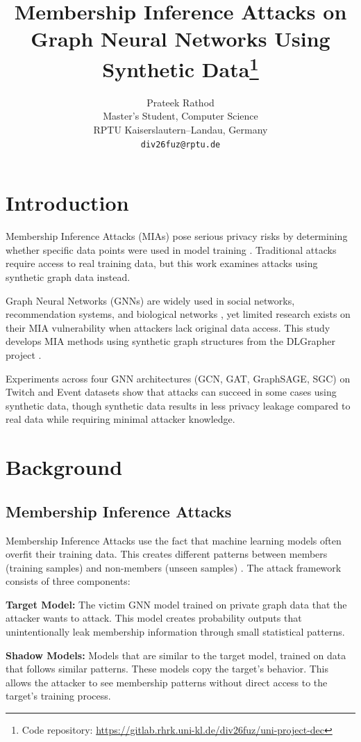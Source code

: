 \documentclass{article}
\title{Membership Inference Attacks on Graph Neural Networks Using Synthetic Data\footnote{Code repository: \url{https://gitlab.rhrk.uni-kl.de/div26fuz/uni-project-dec}}}
\author{Prateek Rathod \\
Master’s Student, Computer Science \\
RPTU Kaiserslautern–Landau, Germany \\
\texttt{div26fuz@rptu.de}}
\date{}
\begin{document}
\maketitle

\section{Introduction}
Membership Inference Attacks (MIAs) pose serious privacy risks by determining whether specific data points were used in model training \cite{shokri2017membership}. Traditional attacks require access to real training data, but this work examines attacks using synthetic graph data instead.

Graph Neural Networks (GNNs) are widely used in social networks, recommendation systems, and biological networks \cite{kipf2017semi, velickovic2018graph, hamilton2017inductive}, yet limited research exists on their MIA vulnerability \cite{olatunji2021membershipinferenceattackgraph} when attackers lack original data access. This study develops MIA methods using synthetic graph structures from the DLGrapher project \cite{lan2024dlgrapher}.

Experiments across four GNN architectures (GCN, GAT, GraphSAGE, SGC) on Twitch and Event datasets show that attacks can succeed in some cases using synthetic data, though synthetic data results in less privacy leakage compared to real data while requiring minimal attacker knowledge.

\section{Background}
\subsection{Membership Inference Attacks}
Membership Inference Attacks use the fact that machine learning models often overfit their training data. This creates different patterns between members (training samples) and non-members (unseen samples) \cite{salem2019ml, nasr2019comprehensive}. The attack framework consists of three components:

\textbf{Target Model:} The victim GNN model trained on private graph data that the attacker wants to attack. This model creates probability outputs that unintentionally leak membership information through small statistical patterns.

\textbf{Shadow Models:} Models that are similar to the target model, trained on data that follows similar patterns. These models copy the target's behavior. This allows the attacker to see membership patterns without direct access to the target's training process.
\end{document}
